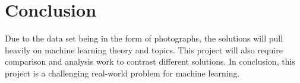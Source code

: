 \documentclass[11pt]{article}
\newcommand{\?}{\stackrel{?}{=}}
\begin{document}
\section{Conclusion}
Due to the data set being in the form of photographs, the solutions will pull 
heavily on machine learning theory and topics. This project will also require 
comparison and analysis work to contrast different solutions. In conclusion, 
this project is a challenging real-world problem for machine learning.

\newpage

\nocite{*}
\end{document}
